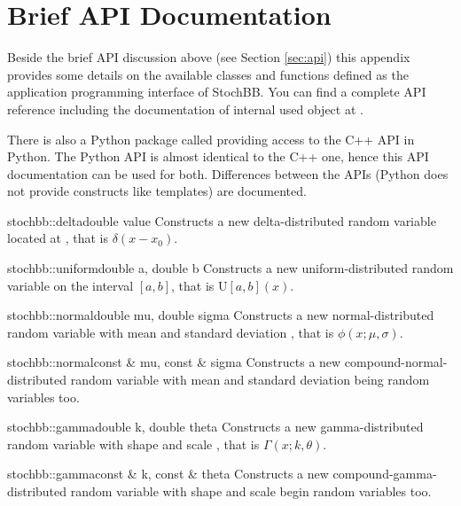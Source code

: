 \section{Brief API Documentation} \label{sec::apidoc}
Beside the brief API discussion above (see Section \ref{sec:api}) this appendix
provides some details on the available classes and  functions defined as the
application programming interface of StochBB. You can find a complete API
reference including the documentation of internal used object at \citep{stochbbapi}.

There is also a Python package called  providing access to the C++
API in Python. The Python API is almost identical to the C++ one, hence this 
API documentation can be used for both. Differences between the APIs (Python 
does not provide constructs like templates) are documented.

\begin{deffunc}{stochbb::delta}{}{double value}	
 Constructs a new delta-distributed random variable located at , that is $\delta(x-x_0)$.
\end{deffunc}

\begin{deffunc}{stochbb::uniform}{}{double a, double b}	
Constructs a new uniform-distributed random variable on the interval $[a,b]$, that is $\text{U}[a,b](x)$.
\end{deffunc}

\begin{deffunc}{stochbb::normal}{}{double mu, double sigma}
Constructs a new normal-distributed random variable with mean  and 
standard deviation  , that is $\phi(x;\mu, \sigma)$.
\end{deffunc}

\begin{deffunc*}{stochbb::normal}{}{const \& mu, const \& sigma}
Constructs a new compound-normal-distributed random variable with mean  and 
standard deviation  being random variables too.
\end{deffunc*}

\begin{deffunc}{stochbb::gamma}{}{double k, double theta}
Constructs a new gamma-distributed random variable with shape  and 
scale  , that is $\Gamma(x; k, \theta)$.
\end{deffunc}

\begin{deffunc*}{stochbb::gamma}{}{const \& k, const \& theta}
Constructs a new compound-gamma-distributed random variable with shape  and 
scale  begin random variables too.
\end{deffunc*}

